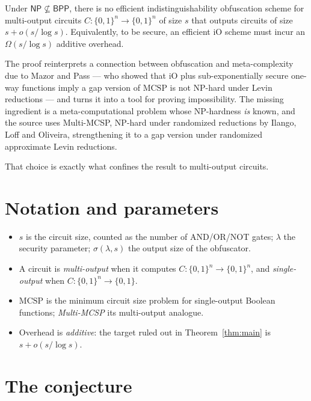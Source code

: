 \documentclass{aicr-conjecture}
\newcommand{\Om}{\Omega}
\newcommand{\bits}{\{0,1\}}
\newcommand{\NP}{\mathsf{NP}}
\newcommand{\BPP}{\mathsf{BPP}}
\newcommand{\MCSP}{\mathrm{MCSP}}
\begin{document}
\begin{theorem}\label{thm:main}
Under $\NP \not\subseteq \BPP$, there is no efficient indistinguishability
obfuscation scheme for multi-output circuits $C : \bits^{n} \to
\bits^{n}$ of size $s$ that outputs circuits of size $s + o(s/\log s)$.
Equivalently, to be secure, an efficient iO scheme must incur an
$\Om(s/\log s)$ additive overhead.
\end{theorem}

The proof reinterprets a connection between obfuscation and
meta-complexity due to Mazor and Pass --- who showed that iO plus
sub-exponentially secure one-way functions imply a gap version of $\MCSP$
is not NP-hard under Levin reductions --- and turns it into a tool for
proving impossibility. The missing ingredient is a meta-computational
problem whose NP-hardness \emph{is} known, and the source uses
Multi-MCSP, NP-hard under randomized reductions by Ilango, Loff and
Oliveira, strengthening it to a gap version under randomized approximate
Levin reductions.

That choice is exactly what confines the result to multi-output circuits.

\section{Notation and parameters}\label{sec:notation}

\begin{itemize}[nosep]
  \item $s$ is the circuit size, counted as the number of AND/OR/NOT
    gates; $\lambda$ the security parameter; $\sigma(\lambda,s)$ the
    output size of the obfuscator.
  \item A circuit is \emph{multi-output} when it computes $C : \bits^{n}
    \to \bits^{n}$, and \emph{single-output} when $C : \bits^{n} \to
    \bits$.
  \item $\MCSP$ is the minimum circuit size problem for single-output
    Boolean functions; \emph{Multi-MCSP} its multi-output analogue.
  \item Overhead is \emph{additive}: the target ruled out in
    Theorem~\ref{thm:main} is $s + o(s/\log s)$.
\end{itemize}

\section{The conjecture}\label{sec:conjectures}
\end{document}
